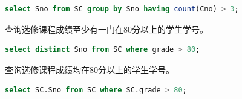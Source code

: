 \documentclass[12pt, a4paper]{report}
\begin{document}
\begin{lstlisting}[language=SQL]
    select Sno from SC group by Sno having count(Cno) > 3;
\end{lstlisting}

\begin{figure}[H] %
    \centering %
\end{figure}

查询选修课程成绩至少有一门在80分以上的学生学号。\\

\begin{lstlisting}[language=SQL]
    select distinct Sno from SC where grade > 80;
\end{lstlisting}

\begin{figure}[H] %
    \centering %
\end{figure}

查询选修课程成绩均在80分以上的学生学号。\\

\begin{lstlisting}[language=SQL]
    select SC.Sno from SC where SC.grade > 80;
\end{lstlisting}

\begin{figure}[H] %
    \centering %
\end{figure}
\end{document}
